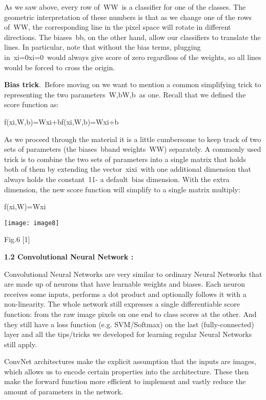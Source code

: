 \documentclass{article} %
\begin{document}
\noindent                        As we saw above, every row of~WW~is a classifier for one of the classes. The geometric interpretation of these numbers is that as we change one of the rows of~WW, the corresponding line in the pixel space will rotate in different directions. The biases~bb, on the other hand, allow our classifiers to translate the lines. In particular, note that without the bias terms, plugging in~xi=0xi=0~would always give score of zero regardless of the weights, so all lines would be forced to cross the origin.

\noindent \textbf{}

\noindent \textbf{Bias trick}.~Before moving on we want to mention a common simplifying trick to representing the two parameters~W,bW,b~as one. Recall that we defined the score function as:

\noindent f(xi,W,b)=Wxi+bf(xi,W,b)=Wxi+b

\noindent As we proceed through the material it is a little cumbersome to keep track of two sets of parameters (the biases~bband weights~WW) separately. A commonly used trick is to combine the two sets of parameters into a single matrix that holds both of them by extending the vector~xixi~with one additional dimension that always holds the constant~11- a default~bias dimension. With the extra dimension, the new score function will simplify to a single matrix multiply:

\noindent f(xi,W)=Wxi

\noindent \texttt{[image: image8]}

\noindent Fig.6  [1]

\noindent 

\noindent \textbf{1.2 Convolutional Neural Network :   }

\noindent                            Convolutional Neural Networks are very similar to ordinary Neural Networks that are made up of neurons that have learnable weights and biases. Each neuron receives some inputs, performs a dot product and optionally follows it with a non-linearity. The whole network still expresses a single differentiable score function: from the raw image pixels on one end to class scores at the other. And they still have a loss function (e.g. SVM/Softmax) on the last (fully-connected) layer and all the tips/tricks we developed for learning regular Neural Networks still apply. 

\noindent                           ConvNet architectures make the explicit assumption that the inputs are images, which allows us to encode certain properties into the architecture. These then make the forward function more efficient to implement and vastly reduce the amount of parameters in the network.
\end{document}
